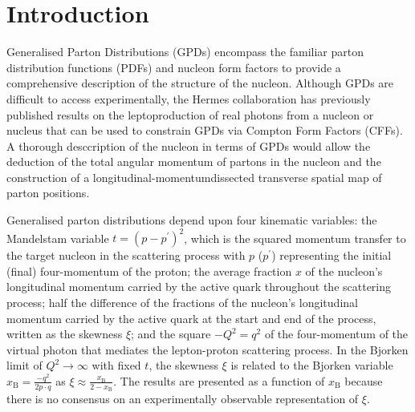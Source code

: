 \section{Introduction}
Generalised Parton Distributions (GPDs)
\cite{Mue94,Ji97a,Rad97} encompass the familiar parton
distribution functions (PDFs) and nucleon form factors to provide a
comprehensive description of the structure of the nucleon.
Although GPDs are difficult to access experimentally, the H{\sc ermes}
collaboration has previously published results
\cite{Air01,Air06,Air08,Air09,Air10, Air10a, Air10b, Air11} on
the leptoproduction of real photons from a nucleon or nucleus that can
be used to constrain GPDs via Compton Form Factors (CFFs). A thorough
desccription of the nucleon in terms of GPDs would allow the deduction
of the total angular momentum of partons in the nucleon\red{,} and the
construction of a longitudinal-momentum\red{-}dissected transverse spatial map of parton positions.

Generalised parton distributions depend upon four kinematic variables: the
Mandelstam variable $t=(p-p^{\prime})^2$, which is the squared momentum
transfer to the target nucleon in the scattering process with $p$ ($p^{\prime}$)
representing the initial (final) four-momentum of the proton; the average
fraction $x$ of the nucleon's longitudinal momentum carried by the active
quark throughout the scattering process; half the difference of
  the fractions of the nucleon's longitudinal momentum carried
by the active quark at the start and end of the process, written as
the skewness $\xi$; and the square $-Q^2=q^2$ of the four-momentum of
the virtual photon that mediates the lepton-proton scattering
process. In the Bjorken limit of $Q^2\rightarrow\infty$ with fixed
$t$, the skewness $\xi$ is related to the Bjorken variable
$x_{\textrm{B}}=\frac{-q^2}{2p\cdot q}$ as
$\xi\approx\frac{x_\textrm{B}}{2-x_\textrm{B}}$. The results are presented
as a function of $x_{\textrm{B}}$ because there is no consensus on an experimentally observable representation of $\xi$. 

